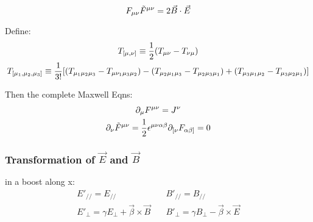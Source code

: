 \[
    F_{\mu\nu}\tilde{F}^{\mu\nu} = 2\vec{B}\cdot\vec{E}
\]

Define: 
\begin{equation}
    \begin{gathered}
	T_{[\mu, \nu]}  \equiv \frac{1}{2} (T_{\mu\nu} - T_{\nu\mu})	\\
	T_{[\mu_1, \mu_2, \mu_3]} \equiv \frac{1}{3!} [(T_{\mu_1\mu_2\mu_3} - T_{\mu\nu_1\mu_3\mu_2})
	- (T_{\mu_2\mu_1\mu_3} - T_{\mu_2\mu_3\mu_1})
	+ (T_{\mu_3\mu_1\mu_2} - T_{\mu_3\mu_2\mu_1})]
    \end{gathered}
\end{equation}

Then the complete Maxwell Eqns:
\begin{equation}
    \begin{gathered}
	\partial_\mu F^{\mu\nu} = J^{\nu}    \\
	\partial_\nu\tilde{F}^{\mu\nu} = \frac{1}{2}\epsilon^{\mu\nu\alpha\beta}\partial_{[\nu}F_{\alpha\beta]} = 0	\\
    \end{gathered}
\end{equation}

\subsubsection{Transformation of $\vec{E}$ and $\vec{B}$}
in a boost along x:
\begin{equation}
    \begin{aligned}
	E'_{//} = E_{//}    \\
	E'_{\perp} = \gamma{E_{\perp} + \vec{\beta}\times\vec{B}}
    \end{aligned}
    \quad
    \begin{aligned}
	B'_{//} = B_{//}    \\
	B'_{\perp} = \gamma{B_{\perp} - \vec{\beta}\times\vec{E}}
    \end{aligned}
\end{equation}
